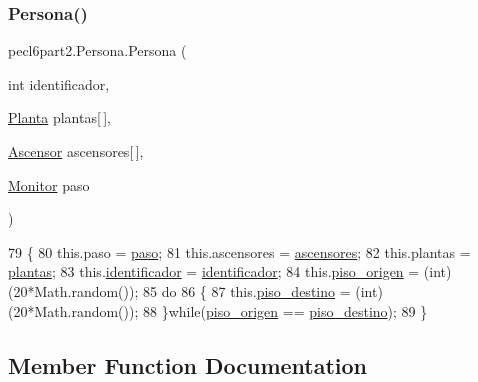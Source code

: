 \subsubsection{\texorpdfstring{Persona()}{Persona()}}
{\footnotesize\ttfamily pecl6part2.\+Persona.\+Persona (\begin{DoxyParamCaption}\item[{int}]{identificador,  }\item[{\mbox{\hyperlink{classpecl6part2_1_1_planta}{Planta}}}]{plantas\mbox{[}$\,$\mbox{]},  }\item[{\mbox{\hyperlink{classpecl6part2_1_1_ascensor}{Ascensor}}}]{ascensores\mbox{[}$\,$\mbox{]},  }\item[{\mbox{\hyperlink{classpecl6part2_1_1_monitor}{Monitor}}}]{paso }\end{DoxyParamCaption})\hspace{0.3cm}{\ttfamily [inline]}}


\begin{DoxyCode}
79     \{
80         this.paso = \mbox{\hyperlink{classpecl6part2_1_1_persona_aa2db1862ae911bee400535c215f5740a}{paso}};
81         this.ascensores = \mbox{\hyperlink{classpecl6part2_1_1_persona_a3e0fca0322fb911f7fb38ad78b46b70f}{ascensores}};
82         this.plantas = \mbox{\hyperlink{classpecl6part2_1_1_persona_a8c92dc1ec730569cae9d9e4f7f04f6fc}{plantas}};
83         this.\mbox{\hyperlink{classpecl6part2_1_1_persona_a8b7b7d11bc23cac7514d1e3c20267589}{identificador}} = \mbox{\hyperlink{classpecl6part2_1_1_persona_a8b7b7d11bc23cac7514d1e3c20267589}{identificador}};
84         this.\mbox{\hyperlink{classpecl6part2_1_1_persona_a64acff116f7c56e347369ec54c9109ad}{piso\_origen}} = (int) (20*Math.random());
85         \textcolor{keywordflow}{do}
86         \{
87             this.\mbox{\hyperlink{classpecl6part2_1_1_persona_af4ceab86e7c49fa1416c701c21479a8b}{piso\_destino}} = (int) (20*Math.random());
88         \}\textcolor{keywordflow}{while}(\mbox{\hyperlink{classpecl6part2_1_1_persona_a64acff116f7c56e347369ec54c9109ad}{piso\_origen}} == \mbox{\hyperlink{classpecl6part2_1_1_persona_af4ceab86e7c49fa1416c701c21479a8b}{piso\_destino}});
89     \}
\end{DoxyCode}


\subsection{Member Function Documentation}
\mbox{\label{classpecl6part2_1_1_persona_a6b30d874756422ab1dfd20f5101cfd4e}} 
